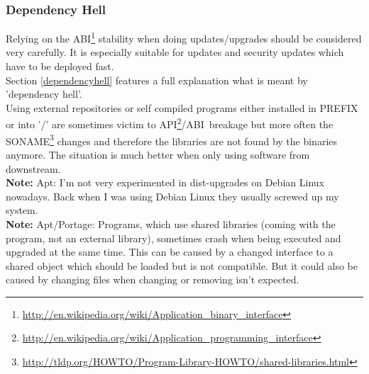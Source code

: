 \documentclass[a4paper,10pt]{article}
\begin{document}

\subsubsection{Dependency Hell}
\label{dephell}
Relying on the ABI\footnote{\url{http://en.wikipedia.org/wiki/Application_binary_interface}} stability when doing updates/upgrades should be considered very carefully. It is especially suitable for updates and security updates which have to be deployed fast. \\

Section \ref{dependencyhell} features a full explanation what is meant by 'dependency hell'.\\

Using external repositories or self compiled programs either installed in PREFIX or into '/' are sometimes victim to API\footnote{\url{http://en.wikipedia.org/wiki/Application_programming_interface}}/ABI\ breakage but more often the SONAME\footnote{\url{http://tldp.org/HOWTO/Program-Library-HOWTO/shared-libraries.html}} changes and therefore the libraries are not found by the binaries anymore. The situation is much better when only using software from downstream.\\

\textbf{Note:} Apt: I'm not very experimented in dist-upgrades on Debian Linux nowadays. Back when I was using Debian Linux they usually screwed up my system.\\

\textbf{Note:} Apt/Portage: Programs, which use shared libraries (coming with the program, not an external library), sometimes crash when being executed and upgraded at the same time. This can be caused by a changed interface to a shared object which should be loaded but is not compatible. But it could also be caused by changing files when changing or removing isn't expected.\\
\end{document}
